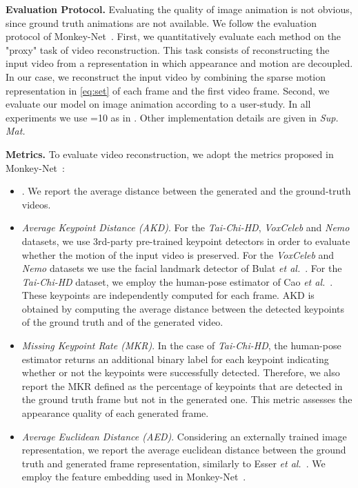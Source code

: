 \documentclass{article}
\def\etal{\textit{et al.}}
\begin{document}
\noindent
\textbf{Evaluation Protocol.}\label{sec:pb}
Evaluating the quality of image animation is not obvious, since ground truth animations are not available. We follow the evaluation protocol of Monkey-Net~\cite{siarohin2018animating}. First, we quantitatively evaluate each method on the "proxy" task of video reconstruction. This task consists of reconstructing the input video from a representation in which appearance and motion are decoupled. In our case, we reconstruct the input video by combining the sparse motion representation in \eqref{eq:set} of each frame and the first video frame.
Second, we evaluate our model on image animation according to a user-study. In all experiments we use =10 as in \cite{siarohin2018animating}. Other implementation details are given in \emph{Sup. Mat.} 

\textbf{Metrics.}
 To evaluate video reconstruction, we adopt the metrics proposed in Monkey-Net~\cite{siarohin2018animating}:
\begin{itemize}[noitemsep,topsep=0pt,wide=0pt]
 \item . We report the average  distance between the generated and the ground-truth videos.
 \item \emph{Average Keypoint Distance (AKD)}. For the  \emph{Tai-Chi-HD},  \emph{VoxCeleb} and \emph{Nemo} datasets, we use 3rd-party pre-trained keypoint detectors in order to evaluate whether the motion of the input video is preserved. For the \emph{VoxCeleb} and \emph{Nemo} datasets we use the facial landmark detector of Bulat \etal~\cite{Bulat_2017_ICCV}. For the \emph{Tai-Chi-HD} dataset, we employ the human-pose estimator of Cao \etal~\cite{cao2017realtime}. 
These keypoints are independently computed for each frame. AKD is obtained by computing the average distance between the detected keypoints of the ground truth and of the generated video. 
\item \emph{ Missing Keypoint Rate (MKR)}. In the case of \emph{Tai-Chi-HD}, the human-pose estimator returns an additional binary label for each keypoint indicating whether or not the keypoints were successfully detected. Therefore, we also report the MKR defined as the percentage of keypoints that are detected in the ground truth frame but not in the generated one. This metric assesses the appearance quality of each generated frame. 
\item \emph{Average Euclidean Distance (AED)}. Considering an externally trained image representation, we report the average euclidean distance between the ground truth and generated frame representation, similarly to Esser \etal~\cite{esser2018variational}. We employ the feature embedding used in Monkey-Net~\cite{siarohin2018animating}.
\end{itemize}
\end{document}
